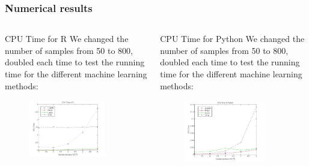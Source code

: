\documentclass{beamer}
\begin{document}
\begin{frame}
\frametitle{Numerical results}
\begin{columns}
\column{2.3in}
	\begin{block}{CPU Time for R}
We changed the number of samples from 50 to 800, doubled each time to test the running time for the different machine learning methods:\\
\begin{figure}
     \includegraphics[width=0.8\textwidth, height=0.5\textheight]{cputime_r.jpg}

    \end{figure}

\end{block}

\column{2.3in}
\begin{block}{CPU Time for Python}
We changed the number of samples from 50 to 800, doubled each time to test the running time for the different machine learning methods:\\
\begin{figure}
     \includegraphics[width=0.8\textwidth, height=0.5\textheight]{cputime_python.jpg}


\end{figure}
\end{block}
\end{columns}
\end{frame}
\end{document}
